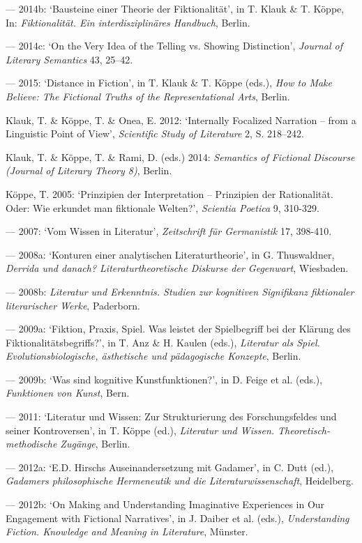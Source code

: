 \begin{hangparas}{.5cm}{1}
--- 2014b: `Bausteine einer Theorie der Fiktionalit\"at', in T. Klauk \& T. K\"oppe, In: \emph{Fiktionalit\"at. Ein interdisziplin\"ares Handbuch}, Berlin.

--- 2014c: `On the Very Idea of the Telling vs. Showing Distinction', \emph{Journal of Literary Semantics} 43, 25--42.

--- 2015: `Distance in Fiction', in T. Klauk \& T. K\"oppe (eds.), \emph{How to Make Believe: The Fictional Truths of the Representational Arts}, Berlin.

Klauk, T. \& K\"oppe, T. \& Onea, E. 2012: `Internally Focalized Narration -- from a Linguistic Point of View', \emph{Scientific Study of Literature} 2, S. 218--242.

Klauk, T. \& K\"oppe, T. \& Rami, D. (eds.) 2014: \emph{Semantics of Fictional Discourse (Journal of Literary Theory 8)}, Berlin.

K\"oppe, T. 2005: `Prinzipien der Interpretation -- Prinzipien der Rationalit\"at. Oder: Wie erkundet man fiktionale Welten?', \emph{Scientia Poetica} 9, 310-329.

--- 2007: `Vom Wissen in Literatur', \emph{Zeitschrift f\"ur Germanistik} 17, 398-410.

--- 2008a: `Konturen einer analytischen Literaturtheorie', in G. Thuswaldner, \emph{Derrida und danach? Literaturtheoretische Diskurse der Gegenwart}, Wiesbaden.

--- 2008b: \emph{Literatur und Erkenntnis. Studien zur kognitiven Signifikanz fiktionaler literarischer Werke}, Paderborn. 

--- 2009a: `Fiktion, Praxis, Spiel. Was leistet der Spielbegriff bei der Kl\"arung des Fiktionalit\"atsbegriffs?', in T. Anz \& H. Kaulen (eds.), \emph{Literatur als Spiel.  Evolutionsbiologische, \"asthetische und p\"adagogische Konzepte}, Berlin.

--- 2009b: `Was sind kognitive Kunstfunktionen?', in D. Feige et al. (eds.), \emph{Funktionen von Kunst}, Bern.

--- 2011: `Literatur und Wissen: Zur Strukturierung des Forschungsfeldes und seiner Kontroversen', in T. K\"oppe (ed.), \emph{Literatur und Wissen. Theoretisch-methodische Zug\"ange}, Berlin.

--- 2012a: `E.D. Hirschs Auseinandersetzung mit Gadamer', in C. Dutt (ed.), \emph{Gadamers philosophische Hermeneutik und die Literaturwissenschaft}, Heidelberg.

--- 2012b: `On Making and Understanding Imaginative Experiences in Our Engagement with Fictional Narratives', in J. Daiber et al. (eds.), \emph{Understanding Fiction. Knowledge and Meaning in Literature}, M\"unster.


\end{hangparas}

